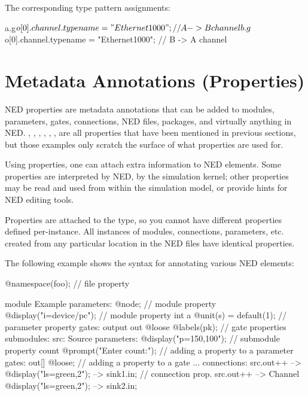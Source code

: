 The corresponding type pattern assignments:

\begin{ned}
a.g$o[0].channel.typename = "Ethernet1000";  // A -> B channel
b.g$o[0].channel.typename = "Ethernet1000";  // B -> A channel
\end{ned}


\section{Metadata Annotations (Properties)}
\label{sec:ned-lang:properties}

NED properties are metadata annotations that can be added to modules, parameters,
gates, connections, NED files, packages, and virtually anything in NED.
, , , , ,
,  are all properties that have been mentioned in
previous sections, but those examples only scratch the surface of what
properties are used for.


Using properties, one can attach extra information to NED elements. Some
properties are interpreted by NED, by the simulation kernel; other
properties may be read and used from within the simulation model, or
provide hints for NED editing tools.

Properties are attached to the type, so you cannot have different properties defined
per-instance. All instances of modules, connections,
parameters, etc. created from any particular location in the NED files have
identical properties.

The following example shows the syntax for annotating various NED elements:

\begin{ned}
@namespace(foo);  // file property

module Example
{
    parameters:
       @node;   // module property
       @display("i=device/pc");   // module property
       int a @unit(s) = default(1); // parameter property
    gates:
       output out @loose @labels(pk);  // gate properties
    submodules:
       src: Source {
           parameters:
              @display("p=150,100");  // submodule property
              count @prompt("Enter count:"); // adding a property to a parameter
           gates:
              out[] @loose;  // adding a property to a gate
       }
       ...
    connections:
       src.out++ --> { @display("ls=green,2"); } --> sink1.in; // connection prop.
       src.out++ --> Channel { @display("ls=green,2"); } --> sink2.in;
}
\end{ned}


